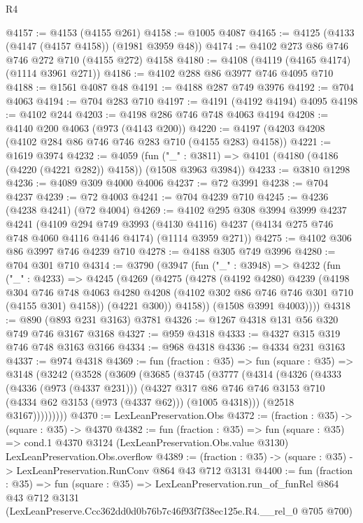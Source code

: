 \begin{lexlean}{R4}
\begin{coremodule}
@4157 := @4153 (@4155 @261)
@4158 := @1005 @4087
@4165 := @4125 (@4133 (@4147 (@4157 @4158)) (@1981 @3959 @48))
@4174 := @4102 @273 @86 @746 @746 @272 @710 (@4155 @272) @4158
@4180 := @4108 (@4119 (@4165 @4174) (@1114 @3961 @271))
@4186 := @4102 @288 @86 @3977 @746 @4095 @710
@4188 := @1561 @4087 @48
@4191 := @4188 @287 @749 @3976
@4192 := @704 @4063
@4194 := @704 @283 @710
@4197 := @4191 (@4192 @4194) @4095
@4198 := @4102 @244
@4203 := @4198 @286 @746 @748 @4063 @4194
@4208 := @4140 @200 @4063 (@973 (@4143 @200))
@4220 := @4197 (@4203 @4208 (@4102 @284 @86 @746 @746 @283 @710 (@4155 @283) @4158))
@4221 := @1619 @3974
@4232 := @4059
    (fun ("_" : @3811) => @4101 (@4180 (@4186 (@4220 (@4221 @282)) @4158)) (@1508 @3963 @3984))
@4233 := @3810 @1298
@4236 := @4089 @309 @4000 @4006
@4237 := @72 @3991
@4238 := @704 @4237
@4239 := @72 @4003
@4241 := @704 @4239 @710
@4245 := @4236 (@4238 @4241) (@72 @4004)
@4269 := @4102
    @295
    @308
    @3994
    @3999
    @4237
    @4241
    (@4109
      @294
      @749
      @3993
      (@4130 @4116)
      @4237
      (@4134 @275 @746 @748 @4060 @4116 @4146 @4174)
      (@1114 @3959 @271))
@4275 := @4102 @306 @86 @3997 @746 @4239 @710
@4278 := @4188 @305 @749 @3996
@4280 := @704 @301 @710
@4314 := @3790
    (@3947
      (fun ("_" : @3948) =>
      @4232
        (fun ("_" : @4233) =>
        @4245
          (@4269
            (@4275
              (@4278
                (@4192 @4280)
                @4239
                (@4198
                  @304
                  @746
                  @748
                  @4063
                  @4280
                  @4208
                  (@4102 @302 @86 @746 @746 @301 @710 (@4155 @301) @4158))
                (@4221 @300))
              @4158))
          (@1508 @3991 @4003))))
@4318 := @890 (@893 @231 @3163) @3781
@4326 := @1267 @4318 @131 @56 @320 @749 @746 @3167 @3168
@4327 := @959 @4318
@4333 := @4327 @315 @319 @746 @748 @3163 @3166
@4334 := @968 @4318
@4336 := @4334 @231 @3163
@4337 := @974 @4318
@4369 := fun (fraction : @35) =>
  fun (square : @35) =>
  @3148
    (@3242
      (@3528
        (@3609
          (@3685
            (@3745
              (@3777
                (@4314
                  (@4326
                    (@4333
                      (@4336 (@973 (@4337 @231)))
                      (@4327
                        @317
                        @86
                        @746
                        @746
                        @3153
                        @710
                        (@4334 @62 @3153 (@973 (@4337 @62)))
                        (@1005 @4318)))
                    (@2518 @3167)))))))))
@4370 := LexLeanPreservation.Obs
@4372 := (fraction : @35) -> (square : @35) -> @4370
@4382 := fun (fraction : @35) =>
  fun (square : @35) =>
  cond.{1} @4370 @3124 (LexLeanPreservation.Obs.value @3130) LexLeanPreservation.Obs.overflow
@4389 := (fraction : @35) -> (square : @35) -> LexLeanPreservation.RunConv @864 @43 @712 @3131
@4400 := fun (fraction : @35) =>
  fun (square : @35) =>
  LexLeanPreservation.run_of_funRel
    @864
    @43
    @712
    @3131
    (LexLeanPreserve.Ccc362dd0d0b76b7c46f93f7f38ec125e.R4.__rel_0 @705 @700)
\end{coremodule}
\end{lexlean}
